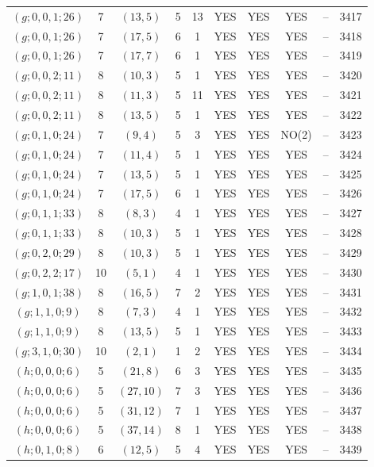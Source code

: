 \begin{longtable}{|c|c|c|c|c|c|c|c|c|c|}
$(g; 0, 0, 1; 26)$ & 7 & $(13, 5)$ & 5 & 13 & YES & YES & YES & -- & 3417\\
$(g; 0, 0, 1; 26)$ & 7 & $(17, 5)$ & 6 & 1 & YES & YES & YES & -- & 3418\\
$(g; 0, 0, 1; 26)$ & 7 & $(17, 7)$ & 6 & 1 & YES & YES & YES & -- & 3419\\
$(g; 0, 0, 2; 11)$ & 8 & $(10, 3)$ & 5 & 1 & YES & YES & YES & -- & 3420\\
$(g; 0, 0, 2; 11)$ & 8 & $(11, 3)$ & 5 & 11 & YES & YES & YES & -- & 3421\\
$(g; 0, 0, 2; 11)$ & 8 & $(13, 5)$ & 5 & 1 & YES & YES & YES & -- & 3422\\
$(g; 0, 1, 0; 24)$ & 7 & $(9, 4)$ & 5 & 3 & YES & YES & NO(2) & -- & 3423\\
$(g; 0, 1, 0; 24)$ & 7 & $(11, 4)$ & 5 & 1 & YES & YES & YES & -- & 3424\\
$(g; 0, 1, 0; 24)$ & 7 & $(13, 5)$ & 5 & 1 & YES & YES & YES & -- & 3425\\
$(g; 0, 1, 0; 24)$ & 7 & $(17, 5)$ & 6 & 1 & YES & YES & YES & -- & 3426\\
$(g; 0, 1, 1; 33)$ & 8 & $(8, 3)$ & 4 & 1 & YES & YES & YES & -- & 3427\\
$(g; 0, 1, 1; 33)$ & 8 & $(10, 3)$ & 5 & 1 & YES & YES & YES & -- & 3428\\
$(g; 0, 2, 0; 29)$ & 8 & $(10, 3)$ & 5 & 1 & YES & YES & YES & -- & 3429\\
$(g; 0, 2, 2; 17)$ & 10 & $(5, 1)$ & 4 & 1 & YES & YES & YES & -- & 3430\\
$(g; 1, 0, 1; 38)$ & 8 & $(16, 5)$ & 7 & 2 & YES & YES & YES & -- & 3431\\
$(g; 1, 1, 0; 9)$ & 8 & $(7, 3)$ & 4 & 1 & YES & YES & YES & -- & 3432\\
$(g; 1, 1, 0; 9)$ & 8 & $(13, 5)$ & 5 & 1 & YES & YES & YES & -- & 3433\\
$(g; 3, 1, 0; 30)$ & 10 & $(2, 1)$ & 1 & 2 & YES & YES & YES & -- & 3434\\
$(h; 0, 0, 0; 6)$ & 5 & $(21, 8)$ & 6 & 3 & YES & YES & YES & -- & 3435\\
$(h; 0, 0, 0; 6)$ & 5 & $(27, 10)$ & 7 & 3 & YES & YES & YES & -- & 3436\\
$(h; 0, 0, 0; 6)$ & 5 & $(31, 12)$ & 7 & 1 & YES & YES & YES & -- & 3437\\
$(h; 0, 0, 0; 6)$ & 5 & $(37, 14)$ & 8 & 1 & YES & YES & YES & -- & 3438\\
$(h; 0, 1, 0; 8)$ & 6 & $(12, 5)$ & 5 & 4 & YES & YES & YES & -- & 3439\\

\end{longtable}

